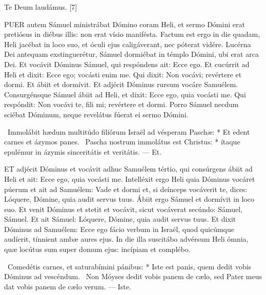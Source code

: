 Te Deum laudámus. [7]






\lettrine[lines=2]{P}{UER} autem Sámuel ministrábat Dómino coram Heli, et sermo Dómini erat pretiósus in diébus illis: non erat vísio manifésta. Factum est ergo in die quadam, Heli jacébat in loco suo, et óculi ejus caligáverant, nec póterat vidére. Lucérna Dei antequam exstinguerétur, Sámuel dormiébat in témplo Dómini, ubi erat arca Dei. Et vocávit Dóminus Sámuel, qui respóndens ait: Ecce ego. Et cucúrrit ad Heli et dixit: Ecce ego; vocásti enim me. Qui dixit: Non vocávi; revértere et dormi. Et ábiit et dormívit. Et adjécit Dóminus rursum vocáre Samuélem. Consurgénsque Sámuel ábiit ad Heli, et dixit: Ecce ego, quia vocásti me. Qui respóndit: Non vocávi te, fili mi; revértere et dormi. Porro Sámuel necdum sciébat Dóminum, neque revelátus fúerat ei sermo Dómini.

\R\ Immolábit hædum multitúdo filiórum Israël ad vésperam Paschæ: * Et edent carnes et ázymos panes. \V\ Pascha nostrum immolátus est Christus: * ítaque epulémur in ázymis sinceritátis et veritátis. --- Et.


\lettrine[lines=2]{E}{T} adjécit Dóminus et vocávit adhuc Samuélem tértio, qui consúrgens ábiit ad Heli et ait: Ecce ego, quia vocásti me. Intelléxit ergo Heli quia Dóminus vocáret púerum et ait ad Samuélem: Vade et dormi et, si deínceps vocáverit te, dices: Lóquere, Dómine, quia audit servus tuus. Ábiit ergo Sámuel et dormívit in loco suo. Et venit Dóminus et stetit et vocávit, sicut vocáverat secúndo: Sámuel, Sámuel. Et ait Sámuel: Lóquere, Dómine, quia audit servus tuus. Et dixit Dóminus ad Samuélem: Ecce ego fácio verbum in Israël, quod quicúmque audíerit, tínnient ambæ aures ejus. In die illa suscitábo advérsum Heli ómnia, quæ locútus sum super domum ejus: incípiam et complébo.

\R\ Comedétis carnes, et saturabímini pánibus: * Iste est panis, quem dedit vobis Dóminus ad vescéndum. \V\ Non Móyses dedit vobis panem de cælo, sed Pater meus dat vobis panem de cælo verum. --- Iste.


